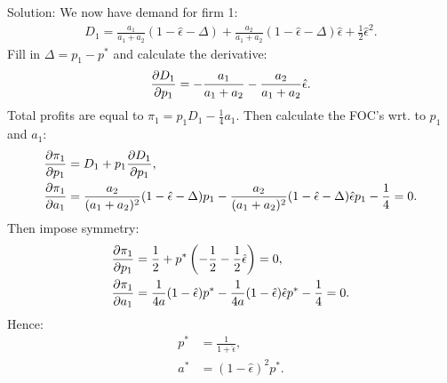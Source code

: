 \begin{enumerate}
	      Solution: We now have demand for firm 1:
	      \begin{align*}
		      D_1=\frac{a_1}{a_1+a_2}(1-\hat\epsilon-\Delta)
		      +\frac{a_2}{a_1+a_2}(1-\hat\epsilon-\Delta)\hat\epsilon
		      +\frac{1}{2}\hat\epsilon^2.
	      \end{align*}
	      Fill in $\Delta=p_1-p^*$ and calculate the derivative:
	      \begin{align*}
		      \frac{\partial D_1}{\partial p_1}=-\frac{a_1}{a_1+a_2}-\frac{a_2}{a_1+a_2}\hat\epsilon.
	      \end{align*}
	      Total profits are equal to $\pi_1=p_1D_1-\frac{1}{4}a_1$. Then
	      calculate the FOC's wrt. to $p_1$ and $a_1$:
	      \begin{align*}
		      \frac{\partial \pi_1}{\partial p_1} & =D_1+p_1\frac{\partial D_1}{\partial p_1},                            \\
		      \frac{\partial \pi_1}{\partial a_1} & =\frac{a_2}{(a_1+a_2)^2}(1-\hat\epsilon-\Delta)p_1-
		      \frac{a_2}{(a_1+a_2)^2}(1-\hat\epsilon-\Delta)\hat\epsilon p_1-\frac{1}{4}=0.
	      \end{align*}
	      Then impose symmetry:
	      \begin{align*}
		      \frac{\partial \pi_1}{\partial p_1} & =\frac{1}{2}+p^*\left(-\frac{1}{2}-\frac{1}{2}\hat\epsilon\right)=0, \\
		      \frac{\partial \pi_1}{\partial a_1} & =\frac{1}{4a}(1-\hat\epsilon)p^*
		      -\frac{1}{4a}(1-\hat\epsilon)\hat\epsilon p^*-\frac{1}{4}=0.
	      \end{align*}
	      Hence:
	      \begin{align*}
		p^*&=\frac{1}{1+\hat\epsilon},\\
		a^*&=(1-\hat\epsilon)^2p^*.
	      \end{align*}
\end{enumerate}
